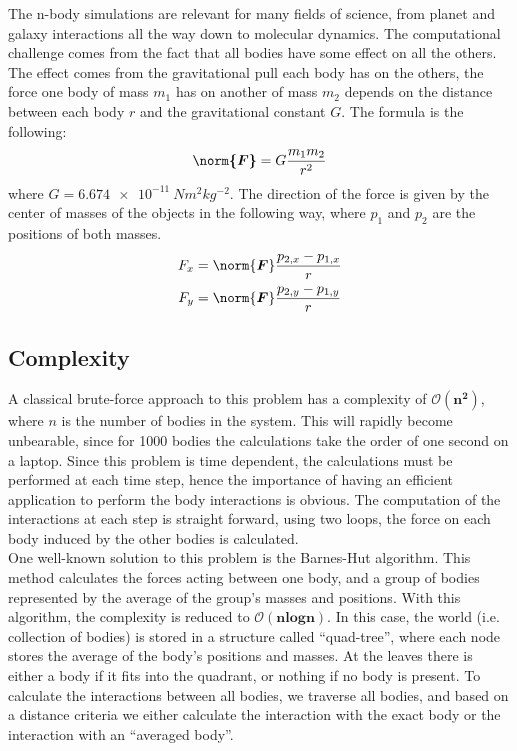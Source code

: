 The n-body simulations are relevant for many fields of science, from planet and galaxy interactions all the way down to molecular dynamics. The computational challenge comes from the fact that all bodies have some effect on all the others. The effect comes from the gravitational pull each body has on the others, the force one body of mass $m_1$ has on another of mass $m_2$ depends on the distance between each body $r$ and the gravitational constant $G$. The formula is the following:
\[\boldsymbol{\norm{F}} = G\frac{m_1m_2}{r^2}\]
where $G=\SI{6.674e-11}{Nm^{2}kg^{-2}}$. The direction of the force is given by the center of masses of the objects in the following way, where $p_1$ and $p_2$ are the positions of both masses. 
\begin{align*}
F_x &= \norm{\boldsymbol{F}}\frac{p_{2,x}-p_{1,x}}{r}\\
F_y &= \norm{\boldsymbol{F}}\frac{p_{2,y}-p_{1,y}}{r}
\end{align*}
\subsection{Complexity}
A classical brute-force approach to this problem has a complexity of $\boldsymbol{\mathcal{O}(n^2)}$, where $n$ is the number of bodies in the system. This will rapidly become unbearable, since for 1000 bodies the calculations take the order of one second on a laptop. Since this problem is time dependent, the calculations must be performed at each time step, hence the importance of having an efficient application to perform the body interactions is obvious. The computation of the interactions at each step is straight forward, using two loops, the force on each body induced by the other bodies is calculated.\\
One well-known solution to this problem is the Barnes-Hut algorithm. This method calculates the forces acting between one body, and a group of bodies represented by the average of the group's masses and positions. With this algorithm, the complexity is reduced to $\boldsymbol{\mathcal{O}(nlogn)}$. In this case, the world (i.e. collection of bodies) is stored in a structure called ``quad-tree'', where each node stores the average of the body's positions and masses. At the leaves there is either a body if it fits into the quadrant, or nothing if no body is present. To calculate the interactions between all bodies, we traverse all bodies, and based on a distance criteria we either calculate the interaction with the exact body or the interaction with an ``averaged body''. 

